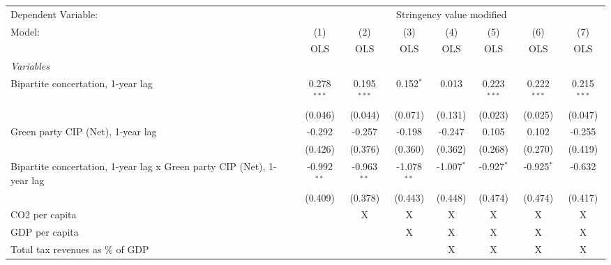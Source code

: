
\begingroup
\centering
\begin{tabular}{lccccccc}
   \toprule
   Dependent Variable: & \multicolumn{7}{c}{Stringency value modified}\\
   Model:                                                                 & (1)           & (2)           & (3)           & (4)          & (5)           & (6)           & (7)\\  
                                                                          &  OLS          & OLS           & OLS           & OLS          & OLS           & OLS           & OLS\\  
   \midrule
   \emph{Variables}\\
   Bipartite concertation, 1-year lag                                     & 0.278$^{***}$ & 0.195$^{***}$ & 0.152$^{*}$   & 0.013        & 0.223$^{***}$ & 0.222$^{***}$ & 0.215$^{***}$\\   
                                                                          & (0.046)       & (0.044)       & (0.071)       & (0.131)      & (0.023)       & (0.025)       & (0.047)\\   
   Green party CIP (Net), 1-year lag                                      & -0.292        & -0.257        & -0.198        & -0.247       & 0.105         & 0.102         & -0.255\\   
                                                                          & (0.426)       & (0.376)       & (0.360)       & (0.362)      & (0.268)       & (0.270)       & (0.419)\\   
   Bipartite concertation, 1-year lag x Green party CIP (Net), 1-year lag & -0.992$^{**}$ & -0.963$^{**}$ & -1.078$^{**}$ & -1.007$^{*}$ & -0.927$^{*}$  & -0.925$^{*}$  & -0.632\\   
                                                                          & (0.409)       & (0.378)       & (0.443)       & (0.448)      & (0.474)       & (0.474)       & (0.417)\\   
   CO2 per capita                                                         &               & X             & X             & X            & X             & X             & X\\  
   GDP per capita                                                         &               &               & X             & X            & X             & X             & X\\  
   Total tax revenues as \% of GDP                                        &               &               &               & X            & X             & X             & X\\  

\end{tabular}
